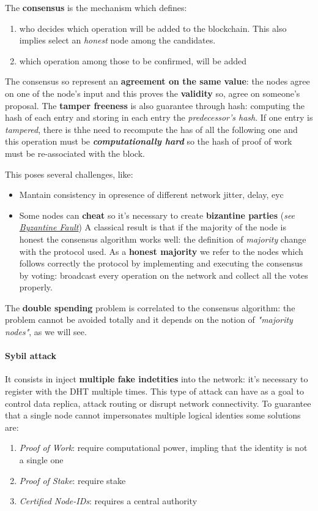 \documentclass[10pt,a4paper]{report}
\begin{document}
The \textbf{consensus} is the mechanism which defines:
\begin{enumerate}
	\item 
	who decides which operation will be added to the blockchain. This also implies select an \textit{honest} node among the candidates.
	\item 
	which operation among those to be confirmed, will be added
\end{enumerate}

The consensus so represent an \textbf{agreement on the same value}: the nodes agree on one of the node's input and this proves the \textbf{validity} so, agree on someone's proposal.
The \textbf{tamper freeness} is also guarantee through hash: computing the hash of each entry and storing in each entry the \textit{predecessor's hash}. If one entry is \textit{tampered}, there is thhe need to recompute the has of all the following one and this operation must be \textit{\textbf{computationally hard}} so the hash of proof of work must be re-associated with the block.

This poses several challenges, like:
\begin{itemize}
	\item 
	Mantain consistency in opresence of different network jitter, delay, eyc
	\item 
	Some nodes can \textbf{cheat} so it's necessary to create \textbf{bizantine parties} (\textit{see \href{https://en.wikipedia.org/wiki/Byzantine_fault}{Byzantine Fault}})
	A classical result is that if the majority of the node is honest the consensus algorithm works well: the definition of \textit{majority} change with the protocol used.
	As a \textbf{honest majority} we refer to the nodes which follows correctly the protocol by implementing and executing the consensus by voting: broadcast every operation on the network and collect all the votes properly.
\end{itemize}

The \textbf{double spending} problem is correlated to the consensus algorithm: the problem cannot be avoided totally and it depends on the notion of \textit{"majority nodes"}, as we will see.

\paragraph{Sybil attack}\label{sec:sybil-attack}
It consists in inject \textbf{multiple fake indetities} into the network: it's necessary to register with the DHT multiple times.
This type of attack can have as a goal to control data replica, attack routing or disrupt network connectivity.
To guarantee that a single node cannot impersonates multiple logical identies some solutions are:
\begin{enumerate}
	\item 
	\textit{Proof of Work}: require computational power, impling that the identity is not a single one
	\item 
	\textit{Proof of Stake}: require stake
	\item 
	\textit{Certified Node-IDs}: requires a central authority
\end{enumerate}
\end{document}
